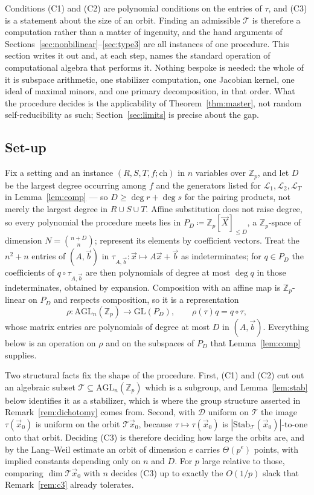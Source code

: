 \documentclass{conjura-solution}
\newcommand{\Zp}{\mathbb{Z}_p}
\newcommand{\vx}{\vec{x}}
\newcommand{\vX}{\vec{X}}
\newcommand{\vb}{\vec{b}}
\newcommand{\LL}{\mathcal{L}}
\newcommand{\GL}{\mathrm{GL}}
\newcommand{\AGL}{\mathrm{AGL}}
\newcommand{\ch}{\mathrm{ch}}
\newcommand{\Stab}{\mathrm{Stab}}
\begin{document}
Conditions \textup{(C1)} and \textup{(C2)} are polynomial conditions on the entries of $\tau$,
and \textup{(C3)} is a statement about the size of an orbit. Finding an admissible $\mathcal T$
is therefore a computation rather than a matter of ingenuity, and the hand arguments of
Sections~\ref{sec:nonbilinear}--\ref{sec:type3} are all instances of one procedure. This
section writes it out and, at each step, names the standard operation of computational algebra
that performs it. Nothing bespoke is needed: the whole of it is subspace arithmetic, one
stabilizer computation, one Jacobian kernel, one ideal of maximal minors, and one primary
decomposition, in that order. What the procedure decides is the applicability of
Theorem~\ref{thm:master}, not random self-reducibility as such;
Section~\ref{sec:limits} is precise about the gap.

\subsection{Set-up}

Fix a setting and an instance $(R,S,T,f;\ch)$ in $n$ variables over $\Zp$, and let $D$ be the
largest degree occurring among $f$ and the generators listed for $\LL_1,\LL_2,\LL_T$ in
Lemma~\ref{lem:comp} --- so $D\ge\deg r+\deg s$ for the pairing products, not merely the
largest degree in $R\cup S\cup T$. Affine substitution does not raise
degree, so every polynomial the procedure meets lies in $P_D\coloneqq\Zp[\vX]_{\le D}$, a
$\Zp$-space of dimension $N=\binom{n+D}{n}$; represent its elements by coefficient vectors.
Treat the $n^{2}+n$ entries of $(A,\vb)$ in $\tau_{A,\vb}\colon\vx\mapsto A\vx+\vb$ as
indeterminates; for $q\in P_D$ the coefficients of $q\circ\tau_{A,\vb}$ are then polynomials of
degree at most $\deg q$ in those indeterminates, obtained by expansion. Composition with an
affine map is $\Zp$-linear on $P_D$ and respects composition, so it is a representation
\[
  \rho\colon\AGL_n(\Zp)\longrightarrow\GL(P_D),\qquad \rho(\tau)q=q\circ\tau,
\]
whose matrix entries are polynomials of degree at most $D$ in $(A,\vb)$. Everything below is an
operation on $\rho$ and on the subspaces of $P_D$ that Lemma~\ref{lem:comp} supplies.

Two structural facts fix the shape of the procedure. First, \textup{(C1)} and \textup{(C2)} cut
out an algebraic subset $\mathcal T\subseteq\AGL_n(\Zp)$ which is a subgroup, and
Lemma~\ref{lem:stab} below identifies it as a stabilizer, which is where the group structure
asserted in Remark~\ref{rem:dichotomy} comes from. Second, with $\mathcal D$ uniform on
$\mathcal T$ the image $\tau(\vx_0)$ is uniform on the orbit $\mathcal T\vx_0$, because
$\tau\mapsto\tau(\vx_0)$ is $|\Stab_{\mathcal T}(\vx_0)|$-to-one onto that orbit. Deciding
\textup{(C3)} is therefore deciding how large the orbits are, and by the Lang--Weil estimate an
orbit of dimension $e$ carries $\Theta(p^{e})$ points, with implied constants depending only on
$n$ and $D$. For $p$ large relative to those, comparing $\dim\mathcal T\vx_0$ with $n$ decides
\textup{(C3)} up to exactly the $O(1/p)$ slack that Remark~\ref{rem:c3} already tolerates.
\end{document}
